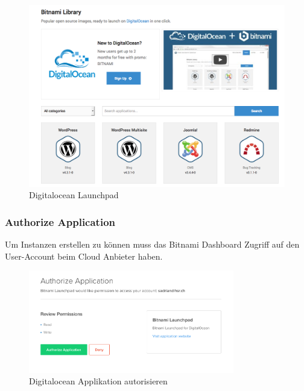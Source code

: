 \begin{figure}[!htbp]
\includegraphics[width=\textwidth]{./03_Analyse/03_Bitnami/images/digitalocean_launchpad}
\caption{Digitalocean Launchpad}
\end{figure}

\newpage
\subsubsection{Authorize Application}
Um Instanzen erstellen zu können muss das Bitnami Dashboard Zugriff auf 
den User-Account beim Cloud Anbieter haben.

\begin{figure}[!htbp]
\includegraphics[width=0.8\textwidth]{./03_Analyse/03_Bitnami/images/digitalocean_authorize}
\caption{Digitalocean Applikation autorisieren}
\end{figure}




